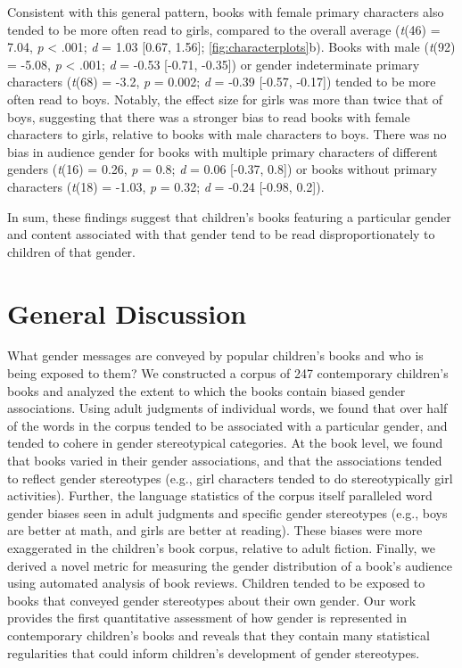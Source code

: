 \documentclass[
  english,
  ,man,floatsintext]{apa6}
\begin{document}
Consistent with this general pattern, books with female primary characters also tended to be more often read to girls, compared to the overall average (\emph{t}(46) = 7.04, \emph{p} \textless{} .001; \emph{d} = 1.03 {[}0.67, 1.56{]}; \autoref{fig:characterplots}b). Books with male (\emph{t}(92) = -5.08, \emph{p} \textless{} .001; \emph{d} = -0.53 {[}-0.71, -0.35{]}) or gender indeterminate primary characters (\emph{t}(68) = -3.2, \emph{p} = 0.002; \emph{d} = -0.39 {[}-0.57, -0.17{]}) tended to be more often read to boys. Notably, the effect size for girls was more than twice that of boys, suggesting that there was a stronger bias to read books with female characters to girls, relative to books with male characters to boys. There was no bias in audience gender for books with multiple primary characters of different genders (\emph{t}(16) = 0.26, \emph{p} = 0.8; \emph{d} = 0.06 {[}-0.37, 0.8{]}) or books without primary characters (\emph{t}(18) = -1.03, \emph{p} = 0.32; \emph{d} = -0.24 {[}-0.98, 0.2{]}).

In sum, these findings suggest that children's books featuring a particular gender and content associated with that gender tend to be read disproportionately to children of that gender.

\hypertarget{general-discussion}{%
\section{General Discussion}\label{general-discussion}}

What gender messages are conveyed by popular children's books and who is being exposed to them? We constructed a corpus of 247 contemporary children's books and analyzed the extent to which the books contain biased gender associations. Using adult judgments of individual words, we found that over half of the words in the corpus tended to be associated with a particular gender, and tended to cohere in gender stereotypical categories. At the book level, we found that books varied in their gender associations, and that the associations tended to reflect gender stereotypes (e.g., girl characters tended to do stereotypically girl activities). Further, the language statistics of the corpus itself paralleled word gender biases seen in adult judgments and specific gender stereotypes (e.g., boys are better at math, and girls are better at reading). These biases were more exaggerated in the children's book corpus, relative to adult fiction. Finally, we derived a novel metric for measuring the gender distribution of a book's audience using automated analysis of book reviews. Children tended to be exposed to books that conveyed gender stereotypes about their own gender. Our work provides the first quantitative assessment of how gender is represented in contemporary children's books and reveals that they contain many statistical regularities that could inform children's development of gender stereotypes.
\end{document}
